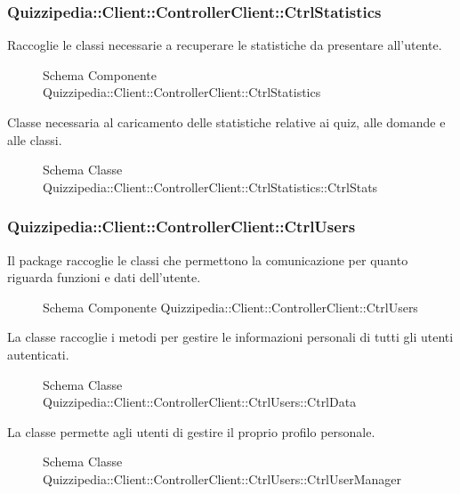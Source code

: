 \subsubsection{Quizzipedia::Client::ControllerClient::CtrlStatistics}
Raccoglie le classi necessarie a recuperare le statistiche da presentare all'utente.
\begin{figure}[H]
\centering
\noindent{}
\caption{Schema Componente Quizzipedia::Client::ControllerClient::CtrlStatistics}
\end{figure}
Classe necessaria al caricamento delle statistiche relative ai quiz, alle domande e alle classi.
\begin{figure}[H]
\centering
\noindent{}
\caption{Schema Classe Quizzipedia::Client::ControllerClient::CtrlStatistics::CtrlStats}
\end{figure}
\subsubsection{Quizzipedia::Client::ControllerClient::CtrlUsers}
Il package raccoglie le classi che permettono la comunicazione per quanto riguarda funzioni e dati dell'utente.
\begin{figure}[H]
\centering
\noindent{}
\caption{Schema Componente Quizzipedia::Client::ControllerClient::CtrlUsers}
\end{figure}
La classe raccoglie i metodi per gestire le informazioni personali di tutti gli utenti autenticati.
\begin{figure}[H]
\centering
\noindent{}
\caption{Schema Classe Quizzipedia::Client::ControllerClient::CtrlUsers::CtrlData}
\end{figure}
La classe permette agli utenti di gestire il proprio profilo personale.
\begin{figure}[H]
\centering
\noindent{}
\caption{Schema Classe Quizzipedia::Client::ControllerClient::CtrlUsers::CtrlUserManager}
\end{figure}
